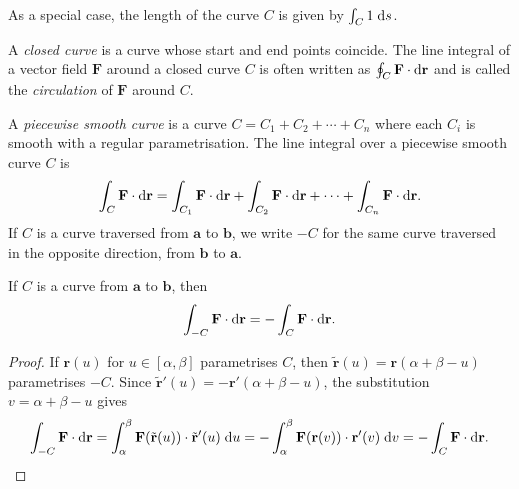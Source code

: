 \documentclass[a4paper]{article}
\begin{document}
\begin{rmk}
  As a special case, the length of the curve $C$ is given by $\int_C 1\;\mathrm{d} s$.
\end{rmk}

\begin{defi}
  A \emph{closed curve} is a curve whose start and end points coincide. The line integral of a vector field $\mathbf{F}$ around a closed curve $C$ is often written as $\oint_C \mathbf{F} \cdot \mathrm{d}\mathbf{r}$ and is called the \emph{circulation} of $\mathbf{F}$ around $C$.
\end{defi}

\begin{defi}
  A \emph{piecewise smooth curve} is a curve $C = C_1 + C_2 + \cdots + C_n$ where each $C_i$ is smooth with a regular parametrisation. The line integral over a piecewise smooth curve $C$ is
  \[
    \int_C \mathbf{F}\cdot \mathrm{d} \mathbf{r} = \int_{C_1} \mathbf{F}\cdot \mathrm{d} \mathbf{r} + \int_{C_2} \mathbf{F}\cdot \mathrm{d} \mathbf{r} + \cdots + \int_{C_n} \mathbf{F}\cdot \mathrm{d} \mathbf{r}.
  \]
  If $C$ is a curve traversed from $\mathbf{a}$ to $\mathbf{b}$, we write $-C$ for the same curve traversed in the opposite direction, from $\mathbf{b}$ to $\mathbf{a}$.
\end{defi}

\begin{prop}
  If $C$ is a curve from $\mathbf{a}$ to $\mathbf{b}$, then
  \[
    \int_{-C} \mathbf{F}\cdot \mathrm{d}\mathbf{r} = -\int_C \mathbf{F}\cdot \mathrm{d}\mathbf{r}.
  \]
\end{prop}

\begin{proof}
  If $\mathbf{r}(u)$ for $u \in [\alpha, \beta]$ parametrises $C$, then $\tilde{\mathbf{r}}(u) = \mathbf{r}(\alpha + \beta - u)$ parametrises $-C$. Since $\tilde{\mathbf{r}}'(u) = -\mathbf{r}'(\alpha + \beta - u)$, the substitution $v = \alpha + \beta - u$ gives
  \[
    \int_{-C} \mathbf{F}\cdot \mathrm{d}\mathbf{r} = \int_\alpha^\beta \mathbf{F}(\tilde{\mathbf{r}}(u)) \cdot \tilde{\mathbf{r}}'(u)\;\mathrm{d} u = -\int_\alpha^\beta \mathbf{F}(\mathbf{r}(v)) \cdot \mathbf{r}'(v)\;\mathrm{d} v = -\int_C \mathbf{F}\cdot \mathrm{d}\mathbf{r}. \qedhere
  \]
\end{proof}
\end{document}
